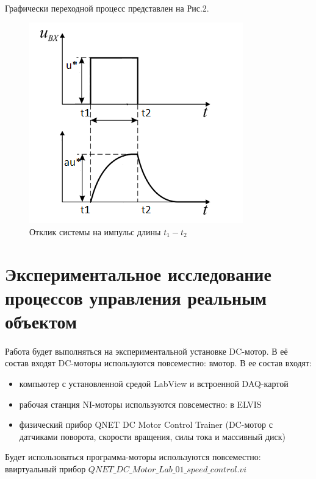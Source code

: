 \documentclass[12pt]{article}
\begin{document}
\paragraph{}
Графически переходной процесс представлен на Рис.2. %
\begin{center}
	

\begin{figure}[h]
\centering	

\includegraphics[scale=0.6]{impulse}
\caption{Отклик системы на импульс длины $t_1 - t_2$}
\end{figure}
\end{center}
\vfill
\newpage






\section*{Экспериментальное исследование
процессов управления реальным объектом}
\paragraph{}
Работа будет выполняться на экспериментальной установке DC-мотор. В её состав входят
DC-моторы используются повсеместно: вмотор. В ее состав входят:
\begin{itemize}
	\item  компьютер с установленной средой LabView и встроенной DAQ-картой
	\item рабочая станция NI-моторы используются повсеместно: в ELVIS
	\item физический прибор QNET DC Motor Control Trainer (DC-мотор с датчиками поворота, скорости вращения, силы тока и массивный диск)
\end{itemize}
Будет использоваться программа-моторы используются повсеместно: ввиртуальный прибор
$QNET\_DC\_Motor\_Lab\_01\_speed\_control.vi$
\end{document}
